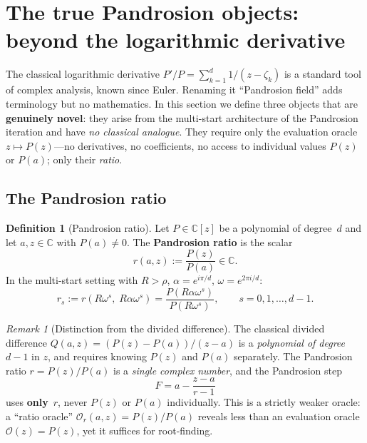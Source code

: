 \documentclass[10pt,a4paper,oneside]{book}
\theoremstyle{definition}
\newtheorem{definition}[theorem]{Definition}
\theoremstyle{remark}
\newtheorem{remark}[theorem]{Remark}
\newcommand{\CC}{\mathbb{C}}
\begin{document}
\section{The true Pandrosion objects: beyond the logarithmic derivative}
\label{sec:true_pandrosion}

The classical logarithmic derivative $P'/P = \sum_{k=1}^d 1/(z - \zeta_k)$ is a standard tool of complex analysis, known since Euler.  Renaming it ``Pandrosion field'' adds terminology but no mathematics.  In this section we define three objects that are \textbf{genuinely novel}: they arise from the multi-start architecture of the Pandrosion iteration and have \emph{no classical analogue}.  They require only the evaluation oracle $z \mapsto P(z)$---no derivatives, no coefficients, no access to individual values $P(z)$ or $P(a)$; only their \emph{ratio}.

\subsection{The Pandrosion ratio}
\label{sec:pand_ratio}

\begin{definition}[Pandrosion ratio]
\label{def:pand_ratio}
Let $P \in \CC[z]$ be a polynomial of degree~$d$ and let $a, z \in \CC$ with $P(a) \neq 0$.  The \textbf{Pandrosion ratio} is the scalar
\begin{equation}
\label{eq:pand_ratio}
\boxed{r(a, z) := \frac{P(z)}{P(a)} \in \CC.}
\end{equation}
In the multi-start setting with $R > \rho$, $\alpha = e^{i\pi/d}$, $\omega = e^{2\pi i/d}$:
\begin{equation}
\label{eq:ratio_vector}
r_s := r(R\omega^s,\; R\alpha\omega^s) = \frac{P(R\alpha\omega^s)}{P(R\omega^s)}, \qquad s = 0, 1, \ldots, d-1.
\end{equation}
\end{definition}

\begin{remark}[Distinction from the divided difference]
The classical divided difference $Q(a,z) = (P(z) - P(a))/(z-a)$ is a \emph{polynomial of degree~$d-1$} in $z$, and requires knowing $P(z)$ and $P(a)$ separately.  The Pandrosion ratio $r = P(z)/P(a)$ is a \emph{single complex number}, and the Pandrosion step
\begin{equation}
\label{eq:step_from_ratio}
F = a - \frac{z - a}{r - 1}
\end{equation}
uses \textbf{only}~$r$, never $P(z)$ or $P(a)$ individually.  This is a strictly weaker oracle: a ``ratio oracle'' $\mathcal{O}_r(a,z) = P(z)/P(a)$ reveals less than an evaluation oracle $\mathcal{O}(z) = P(z)$, yet it suffices for root-finding.
\end{remark}
\end{document}
